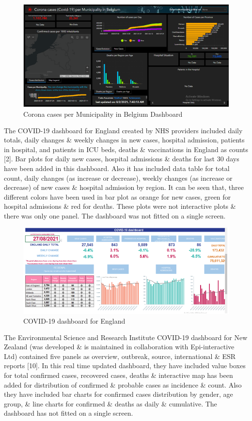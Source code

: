 \documentclass[
]{article}
\begin{document}
\begin{figure}
\includegraphics[width=8.39in]{Images/4} \caption{Corona cases per Municipality in Belgium Dashboard}\label{fig:unnamed-chunk-4}
\end{figure}

The COVID-19 dashboard for England created by NHS providers included
daily totals, daily changes \& weekly changes in new cases, hospital
admission, patients in hospital, and patients in ICU beds, deaths \&
vaccinations in England as counts {[}2{]}. Bar plots for daily new
cases, hospital admissions \& deaths for last 30 days have been added in
this dashboard. Also it has included data table for total count, daily
changes (as increase or decrease), weekly changes (as increase or
decrease) of new cases \& hospital admission by region. It can be seen
that, three different colors have been used in bar plot as orange for
new cases, green for hospital admissions \& red for deaths. These plots
were not interactive plots \& there was only one panel. The dashboard
was not fitted on a single screen.

\begin{figure}
\includegraphics[width=8.46in]{Images/5} \caption{COVID-19 dashboard for England}\label{fig:unnamed-chunk-5}
\end{figure}

The Environmental Science and Research Institute COVID-19 dashboard for
New Zealand (was developed \& is maintained in collaboration with
Epi-interactive Ltd) contained five panels as overview, outbreak,
source, international \& ESR reports {[}10{]}. In this real time updated
dashboard, they have included value boxes for total confirmed cases,
recovered cases, deaths \& interactive map has been added for
distribution of confirmed \& probable cases as incidence \& count. Also
they have included bar charts for confirmed cases distribution by
gender, age group, \& line charts for confirmed \& deaths as daily \&
cumulative. The dashboard has not fitted on a single screen.
\end{document}
